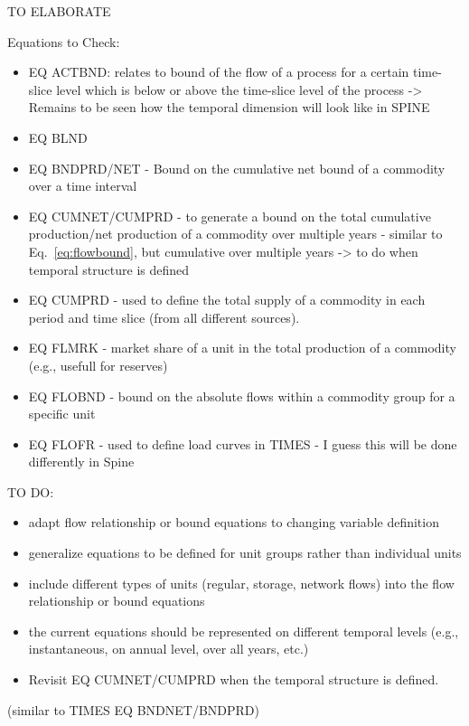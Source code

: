 {\color{red} TO ELABORATE

Equations to Check:
\begin{itemize}
	\item EQ ACTBND: relates to bound of the flow of a process for a certain time-slice level which is below or above the time-slice level of the process -> Remains to be seen how the temporal dimension will look like in SPINE
	\item EQ BLND
	\item EQ BNDPRD/NET - Bound on the cumulative net bound of a commodity over a time interval
	\item EQ CUMNET/CUMPRD - to generate a bound on the total cumulative production/net production of a commodity over multiple years - similar to Eq.~\eqref{eq:flowbound}, but cumulative over multiple years -> to do when temporal structure is defined
	\item EQ CUMPRD - used to define the total supply of a commodity in each period and time slice (from all different sources).
	\item EQ FLMRK - market share of a unit in the total production of a commodity (e.g., usefull for reserves)
	\item EQ FLOBND - bound on the absolute flows within a commodity group for a specific unit
	\item EQ FLOFR - used to define load curves in TIMES - I guess this will be done differently in Spine
\end{itemize}
}


{\color{red}
TO DO:
\begin{itemize}
	\item adapt flow relationship or bound equations to changing variable definition
	\item generalize equations to be defined for unit groups rather than individual units
	\item include different types of units (regular, storage, network flows) into the flow relationship or bound equations
	\item the current equations should be represented on different temporal levels (e.g., instantaneous, on annual level, over all years, etc.)
	\item Revisit EQ CUMNET/CUMPRD when the temporal structure is defined.
\end{itemize}
}

(similar to TIMES EQ BNDNET/BNDPRD)





